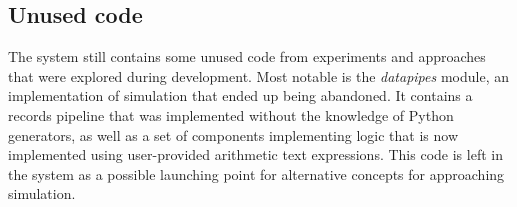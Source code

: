 \subsection{Unused code}

The system still contains some unused code from experiments and approaches that were explored during development. Most notable is the \emph{datapipes} module, an implementation of simulation that ended up being abandoned. It contains a records pipeline that was implemented without the knowledge of Python generators, as well as a set of components implementing logic that is now implemented using user-provided arithmetic text expressions. This code is left in the system as a possible launching point for alternative concepts for approaching simulation.

\clearpage
